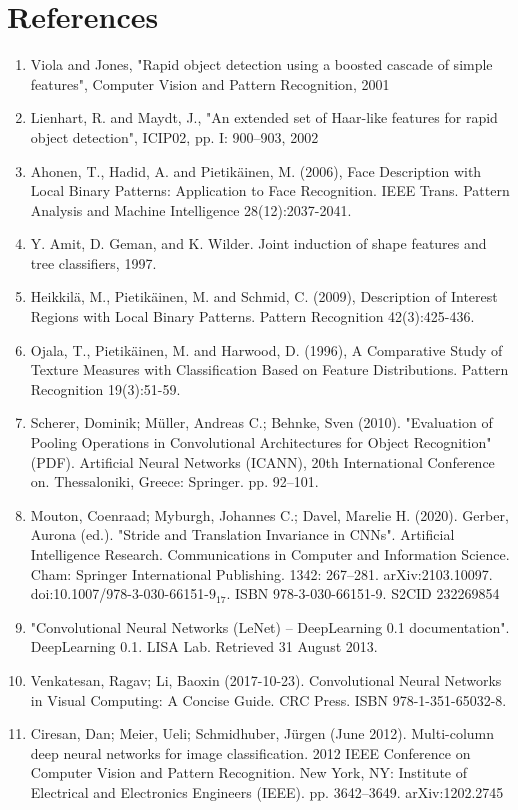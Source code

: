 \documentclass[12pt,a4paper]{article}
\begin{document}
\section*{References}
\begin{enumerate}
\item Viola and Jones, "Rapid object detection using a boosted cascade of simple features", Computer Vision and Pattern Recognition, 2001
\item Lienhart, R. and Maydt, J., "An extended set of Haar-like features for rapid object detection", ICIP02, pp. I: 900–903, 2002
\item Ahonen, T., Hadid, A. and Pietikäinen, M. (2006), Face Description with Local Binary Patterns: Application to Face Recognition. IEEE Trans. Pattern Analysis and Machine Intelligence 28(12):2037-2041.
\item  Y. Amit, D. Geman, and K. Wilder. Joint induction of shape features and tree
classifiers, 1997.
\item Heikkilä, M., Pietikäinen, M. and Schmid, C. (2009), Description of Interest Regions with Local Binary Patterns. Pattern Recognition 42(3):425-436.
\item Ojala, T., Pietikäinen, M. and Harwood, D. (1996), A Comparative Study of Texture Measures with Classification Based on Feature Distributions. Pattern Recognition 19(3):51-59.
\item Scherer, Dominik; Müller, Andreas C.; Behnke, Sven (2010). "Evaluation of Pooling Operations in Convolutional Architectures for Object Recognition" (PDF). Artificial Neural Networks (ICANN), 20th International Conference on. Thessaloniki, Greece: Springer. pp. 92–101.
\item Mouton, Coenraad; Myburgh, Johannes C.; Davel, Marelie H. (2020). Gerber, Aurona (ed.). "Stride and Translation Invariance in CNNs". Artificial Intelligence Research. Communications in Computer and Information Science. Cham: Springer International Publishing. 1342: 267–281. arXiv:2103.10097. doi:10.1007/978-3-030-66151-$9_17$. ISBN 978-3-030-66151-9. S2CID 232269854
\item "Convolutional Neural Networks (LeNet) – DeepLearning 0.1 documentation". DeepLearning 0.1. LISA Lab. Retrieved 31 August 2013.
\item Venkatesan, Ragav; Li, Baoxin (2017-10-23). Convolutional Neural Networks in Visual Computing: A Concise Guide. CRC Press. ISBN 978-1-351-65032-8.
\item Ciresan, Dan; Meier, Ueli; Schmidhuber, Jürgen (June 2012). Multi-column deep neural networks for image classification. 2012 IEEE Conference on Computer Vision and Pattern Recognition. New York, NY: Institute of Electrical and Electronics Engineers (IEEE). pp. 3642–3649. arXiv:1202.2745

\end{enumerate}
\end{document}
